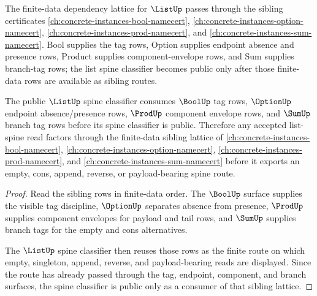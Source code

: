 The finite-data dependency lattice for $\ListUp$ passes through the sibling certificates \autoref{ch:concrete-instances-bool-namecert}, \autoref{ch:concrete-instances-option-namecert}, \autoref{ch:concrete-instances-prod-namecert}, and \autoref{ch:concrete-instances-sum-namecert}. Bool supplies the tag rows, Option supplies endpoint absence and presence rows, Product supplies component-envelope rows, and Sum supplies branch-tag rows; the list spine classifier becomes public only after those finite-data rows are available as sibling routes.

\begin{theorem}
\label{thm:list-finite-data-sibling-route}
The public $\ListUp$ spine classifier consumes $\BoolUp$ tag rows, $\OptionUp$ endpoint absence/presence rows, $\ProdUp$ component envelope rows, and $\SumUp$ branch tag rows before its spine classifier is public. Therefore any accepted list-spine read factors through the finite-data sibling lattice of \autoref{ch:concrete-instances-bool-namecert}, \autoref{ch:concrete-instances-option-namecert}, \autoref{ch:concrete-instances-prod-namecert}, and \autoref{ch:concrete-instances-sum-namecert} before it exports an empty, cons, append, reverse, or payload-bearing spine route.
\end{theorem}
\begin{proof}
Read the sibling rows in finite-data order. The $\BoolUp$ surface supplies the visible tag discipline, $\OptionUp$ separates absence from presence, $\ProdUp$ supplies component envelopes for payload and tail rows, and $\SumUp$ supplies branch tags for the empty and cons alternatives.

The $\ListUp$ spine classifier then reuses those rows as the finite route on which empty, singleton, append, reverse, and payload-bearing reads are displayed. Since the route has already passed through the tag, endpoint, component, and branch surfaces, the spine classifier is public only as a consumer of that sibling lattice.
\end{proof}
